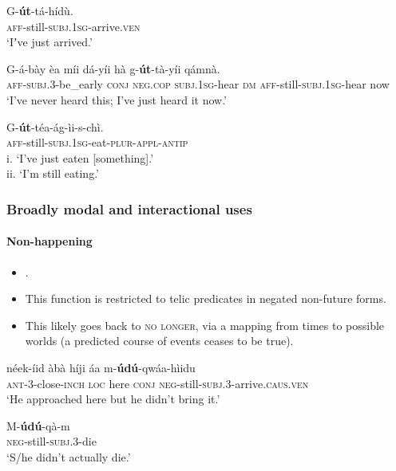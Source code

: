 \begin{exe}
	\ex \gll G-\textbf{út}-tá-hídù.\\
	\textsc{aff}-still-\textsc{subj}.1\textsc{sg}-arrive.\textsc{ven}\\
	\glt \lq  Iʼve just arrived.' \parencite[430]{Mitchell2021}

	\ex
	\gll G-á-bày èa míi dá-yíi hà g-\textbf{út}-tà-yíi qámnà.\\
\textsc{aff}-\textsc{subj}.3-be\_early \textsc{conj} \textsc{neg}.\textsc{cop} \textsc{subj}.1\textsc{sg}-hear \textsc{dm} \textsc{aff}-still-\textsc{subj}.1\textsc{sg}-hear now\\
	\glt \lq I've never heard this; I've just heard it now.' \parencite[431]{Mitchell2021}

	\ex\label{exAppendixDatoogaNearPast3}
	\gll G-\textbf{út}-téa-ág-ìi-s-chì.\\
	\textsc{aff}-still-\textsc{subj}.1\textsc{sg}-eat-\textsc{plur}-\textsc{appl}-\textsc{antip}\\
	\glt i.\phantom{i} \lq I've just eaten [something].'\\
	ii. \lq I'm still eating.' \parencite[430]{Mitchell2021}
\end{exe}

\subsubsection{Broadly modal and interactional uses}
\paragraph{Non-happening}\label{appendixDatoogaNonHappening}
\begin{itemize}
	\item \textcite{Mitchell2021}.
	\item This function is restricted to telic predicates in negated non-future forms.
	\item This likely goes back to \textsc{no longer}, via a mapping from times to possible worlds (a predicted course of events ceases to be true).
\end{itemize}

\begin{exe}
	\ex \gll [N-ì-]néek-íid àbà híji áa m-\textbf{údú}-qwáa-hìidu\\
\textsc{ant}-3-close-\textsc{inch} \textsc{loc} here \textsc{conj} \textsc{neg}-still-\textsc{subj}.3-arrive.\textsc{caus.ven}\\
	\glt \lq He approached here but he didn't bring it.' \parencite[431]{Mitchell2021}

	\ex\gll M-\textbf{údú}-qà-m\\
	\textsc{neg}-still-\textsc{subj}.3-die\\
	\glt \lq S/he didn’t actually die.' \parencite[432]{Mitchell2021}
\end{exe}

